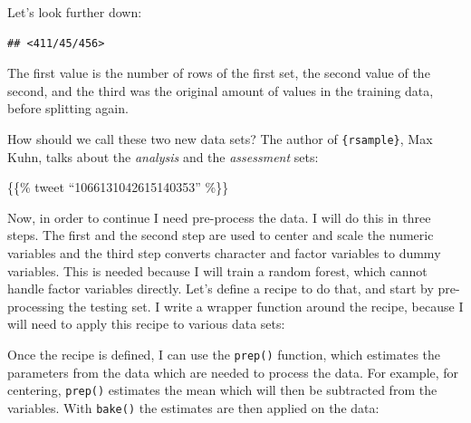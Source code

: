 \documentclass[]{gitbook}
\newenvironment{Shaded}{\begin{snugshade}}{\end{snugshade}}
\newcommand{\ControlFlowTok}[1]{\textcolor[rgb]{0.13,0.29,0.53}{\textbf{#1}}}
\newcommand{\DataTypeTok}[1]{\textcolor[rgb]{0.13,0.29,0.53}{#1}}
\newcommand{\DecValTok}[1]{\textcolor[rgb]{0.00,0.00,0.81}{#1}}
\newcommand{\KeywordTok}[1]{\textcolor[rgb]{0.13,0.29,0.53}{\textbf{#1}}}
\newcommand{\NormalTok}[1]{#1}
\newcommand{\OperatorTok}[1]{\textcolor[rgb]{0.81,0.36,0.00}{\textbf{#1}}}
\newcommand{\StringTok}[1]{\textcolor[rgb]{0.31,0.60,0.02}{#1}}
\begin{document}
Let's look further down:

\begin{Shaded}
\end{Shaded}

\begin{verbatim}
## <411/45/456>
\end{verbatim}

The first value is the number of rows of the first set, the second value of the second, and the third
was the original amount of values in the training data, before splitting again.

How should we call these two new data sets? The author of \texttt{\{rsample\}}, Max Kuhn, talks about
the \emph{analysis} and the \emph{assessment} sets:

\{\{\% tweet ``1066131042615140353'' \%\}\}

Now, in order to continue I need pre-process the data. I will do this in three steps.
The first and the second step are used to center and scale the numeric variables and the third step
converts character and factor variables to dummy variables. This is needed because I will train a
random forest, which cannot handle factor variables directly. Let's define a recipe to do that,
and start by pre-processing the testing set. I write a wrapper function around the recipe,
because I will need to apply this recipe to various data sets:

\begin{Shaded}
\end{Shaded}

Once the recipe is defined, I can use the \texttt{prep()} function, which estimates the parameters from
the data which are needed to process the data. For example, for centering, \texttt{prep()} estimates
the mean which will then be subtracted from the variables. With \texttt{bake()} the estimates are then
applied on the data:
\end{document}
